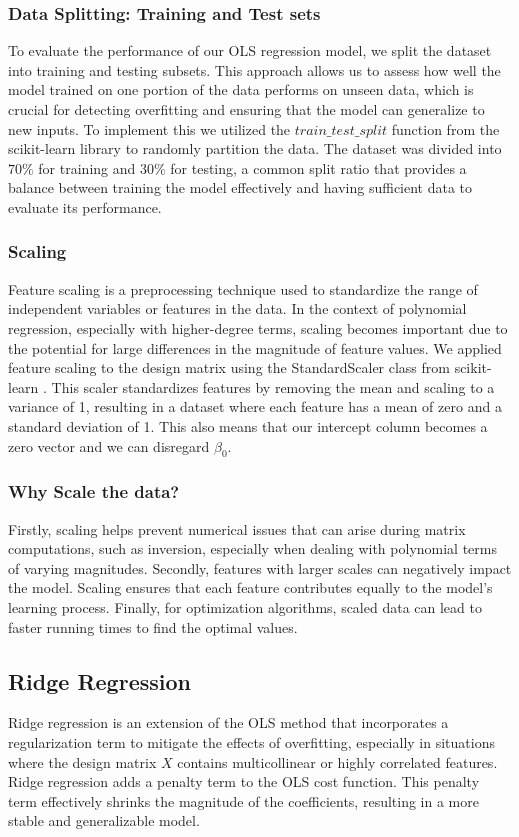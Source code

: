 \documentclass{article}
\begin{document}
\subsubsection{Data Splitting: Training and Test sets}
To evaluate the performance of our OLS regression model, we split the dataset into training and testing subsets. This approach allows us to assess how well the model trained on one portion of the data performs on unseen data, which is crucial for detecting overfitting and ensuring that the model can generalize to new inputs. 
To implement this we utilized the \(train \_ test \_ split\) function from the scikit-learn \cite{scikit-learn} library to randomly partition the data. The dataset was divided into \(70\%\) for training and \(30\%\) for testing, a common split ratio that provides a balance between training the model effectively and having sufficient data to evaluate its performance.

\subsubsection{Scaling}
Feature scaling is a preprocessing technique used to standardize the range of independent variables or features in the data. In the context of polynomial regression, especially with higher-degree terms, scaling becomes important due to the potential for large differences in the magnitude of feature values. We applied feature scaling to the design matrix using the StandardScaler class from scikit-learn \cite{scikit-learn}. This scaler standardizes features by removing the mean and scaling to a variance of 1, resulting in a dataset where each feature has a mean of zero and a standard deviation of 1. This also means that our intercept column becomes a zero vector and we can disregard \(\beta_0.\)

\subsubsection{Why Scale the data?}
Firstly, scaling helps prevent numerical issues that can arise during matrix computations, such as inversion, especially when dealing with polynomial terms of varying magnitudes. Secondly, features with larger scales can negatively impact the model. Scaling ensures that each feature contributes equally to the model's learning process. Finally, for optimization algorithms, scaled data can lead to faster running times to find the optimal values.

\subsection{Ridge Regression}
Ridge regression is an extension of the OLS method that incorporates a regularization term to mitigate the effects of overfitting, especially in situations where the design matrix \(X\) contains multicollinear or highly correlated features. Ridge regression adds a penalty term to the OLS cost function. This penalty term effectively shrinks the magnitude of the coefficients, resulting in a more stable and generalizable model.
\newline
\end{document}
